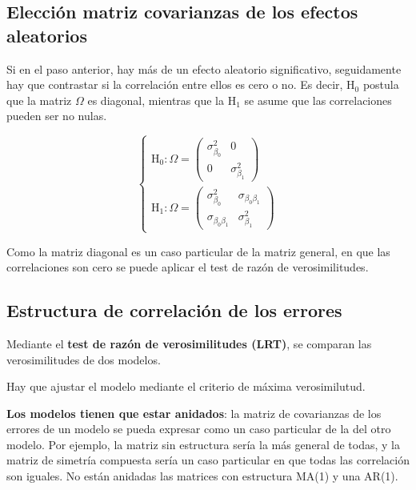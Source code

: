 \documentclass[
]{book}
\begin{document}
\hypertarget{elecciuxf3n-matriz-covarianzas-de-los-efectos-aleatorios}{%
\subsection{Elección matriz covarianzas de los efectos aleatorios}\label{elecciuxf3n-matriz-covarianzas-de-los-efectos-aleatorios}}

Si en el paso anterior, hay más de un efecto aleatorio significativo, seguidamente hay que contrastar si la correlación entre ellos es cero o no. Es decir, H\(_0\) postula que la matriz \(\Omega\) es diagonal, mientras que la H\(_1\) se asume que las correlaciones pueden ser no nulas.

\[\left\{\begin{array}{l}
\text{H}_0: \Omega= 
\begin{pmatrix}
\sigma_{\beta_0}^2 & 0 \\
0 & \sigma_{\beta_1}^2
\end{pmatrix}\\
\text{H}_1: \Omega= 
\begin{pmatrix}
\sigma_{\beta_0}^2 & \sigma_{\beta_0\beta_1} \\
\sigma_{\beta_0\beta_1} & \sigma_{\beta_1}^2
\end{pmatrix}
\end{array}\right.
\]

Como la matriz diagonal es un caso particular de la matriz general, en que las correlaciones son cero se puede aplicar el test de razón de verosimilitudes.

\hypertarget{estructura-de-correlaciuxf3n-de-los-errores}{%
\subsection{Estructura de correlación de los errores}\label{estructura-de-correlaciuxf3n-de-los-errores}}

Mediante el \textbf{test de razón de verosimilitudes (LRT)}, se comparan las verosimilitudes de dos modelos.

Hay que ajustar el modelo mediante el criterio de máxima verosimilutud.

\textbf{Los modelos tienen que estar anidados}: la matriz de covarianzas de los errores de un modelo se pueda expresar como un caso particular de la del otro modelo. Por ejemplo, la matriz sin estructura sería la más general de todas, y la matriz de simetría compuesta sería un caso particular en que todas las correlación son iguales.
No están anidadas las matrices con estructura MA(1) y una AR(1).
\end{document}
